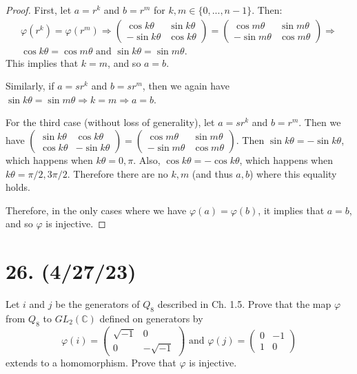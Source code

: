 \documentclass{article}
\begin{document}
\begin{enumerate}[label=(\alph*)]
\begin{proof}
            First, let $a = r^k$ and $b = r^m$ for $k, m \in \{0, ..., n - 1\}$. Then:
            \begin{multline*}
                \varphi(r^k) = \varphi(r^m) \Rightarrow \begin{pmatrix}\cos k \theta & \sin k \theta \\ -\sin k \theta & \cos k \theta\end{pmatrix} = \begin{pmatrix}\cos m \theta & \sin m \theta \\ -\sin m \theta & \cos m \theta\end{pmatrix} \Rightarrow \\ \cos k \theta = \cos m \theta \text{ and } \sin k \theta = \sin m \theta.
            \end{multline*}
            This implies that $k = m$, and so $a = b$.

            Similarly, if $a = sr^k$ and $b = sr^m$, then we again have $\sin k \theta = \sin m \theta \Rightarrow k = m \Rightarrow a = b$.

            For the third case (without loss of generality), let $a = sr^k$ and $b = r^m$. Then we have $\begin{pmatrix}\sin k \theta & \cos k \theta \\ \cos k \theta & -\sin k \theta\end{pmatrix} = \begin{pmatrix}\cos m \theta & \sin m \theta \\ -\sin m \theta & \cos m \theta\end{pmatrix}$. Then $\sin k \theta = -\sin k \theta$, which happens when $k \theta = 0, \pi$. Also, $\cos k \theta = -\cos k \theta$, which happens when $k \theta = \pi / 2, 3\pi / 2$. Therefore there are no $k, m$ (and thus $a, b$) where this equality holds.

            Therefore, in the only cases where we have $\varphi(a) = \varphi(b)$, it implies that $a = b$, and so $\varphi$ is injective.
          \end{proof}
\end{enumerate}

\section*{26. (4/27/23)}

Let $i$ and $j$ be the generators of $Q_8$ described in Ch. 1.5. Prove that the map $\varphi$ from $Q_8$ to $GL_2(\mathbb{C})$ defined on generators by
\begin{equation*}
    \varphi(i) = \begin{pmatrix}\sqrt{-1} & 0 \\ 0 & -\sqrt{-1}\end{pmatrix} \text{ and } \varphi(j) = \begin{pmatrix}0 & -1 \\ 1 & 0\end{pmatrix}
\end{equation*}
extends to a homomorphism. Prove that $\varphi$ is injective.
\end{document}
